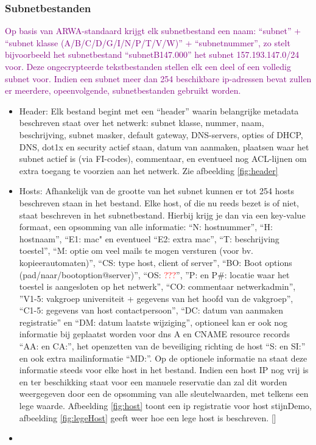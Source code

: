 \subsubsection{Subnetbestanden}
\textcolor{purple}{Op basis van ARWA-standaard krijgt elk subnetbestand een naam: “subnet” + “subnet klasse (A/B/C/D/G/I/N/P/T/V/W)” + “subnetnummer”, zo stelt bijvoorbeeld het subnetbestand “subnetB147.000” het subnet 157.193.147.0/24 voor. Deze ongecrypteerde tekstbestanden stellen elk een deel of een volledig subnet voor. Indien een subnet meer dan 254 beschikbare \acrshort{ip}-adressen bevat zullen er meerdere, opeenvolgende, subnetbestanden gebruikt worden.}
\begin{itemize}
    \item Header: Elk bestand begint met een “header” waarin belangrijke metadata beschreven staat over het netwerk: subnet klasse, nummer, naam, beschrijving, subnet masker, default gateway, DNS-servers, opties of DHCP, DNS, dot1x en security actief staan, datum van aanmaken, plaatsen waar het subnet actief is (via FI-codes), commentaar, en eventueel nog ACL-lijnen om extra toegang te voorzien aan het netwerk. Zie afbeelding \ref{fig:header}
    \item Hosts: Afhankelijk van de grootte van het subnet kunnen er tot 254 hosts beschreven staan in het bestand. Elke host, of die nu reeds bezet is of niet, staat beschreven in het subnetbestand. Hierbij krijg je dan via een key-value formaat, een opsomming van alle informatie: “N: hostnummer”, “H: hostnaam”, “E1: \acrshort{mac}" en eventueel “E2: extra \acrshort{mac}”, “T: beschrijving toestel”, “M: optie om veel mails te mogen versturen (voor bv. kopieerautomaten)”, “CS: type host, client of server”, “BO: Boot options (pad/naar/bootoption@server)”, “OS:  \textcolor{red}{???}”, ”P: en P#: locatie waar het toestel is aangesloten op het netwerk”, “CO: commentaar netwerkadmin”, ”V1-5: vakgroep universiteit + gegevens van het hoofd van de vakgroep”, “C1-5: gegevens van host contactpersoon”, “DC: datum van aanmaken registratie” en “DM: datum laatste wijziging”, optioneel kan er ook nog informatie bij geplaatst worden voor \acrshort{dns} A en CNAME resource records “AA: en CA:”, het openzetten van de beveiliging richting de host “S: en SI:” en ook extra mailinformatie “MD:”. Op de optionele informatie na staat deze informatie steeds voor elke host in het bestand. Indien een host \acrshort{IP} nog vrij is en ter beschikking staat voor een manuele reservatie dan zal dit worden weergegeven door een de opsomming van alle sleutelwaarden, met telkens een lege waarde. Afbeelding \ref{fig:host} toont een \acrshort{ip} registratie voor host stijnDemo, afbeelding \ref{fig:legeHost} geeft weer hoe een lege host is beschreven.
    []\item \end{itemize}
